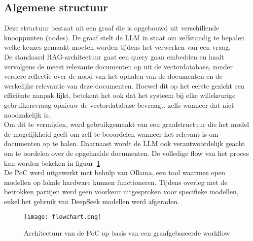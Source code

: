 \subsection{Algemene structuur}

Deze structuur bestaat uit een graaf die is opgebouwd uit verschillende knooppunten (nodes). De graaf stelt de LLM in staat om zelfstandig te bepalen welke keuzes gemaakt moeten worden tijdens het verwerken van een vraag.
\\[1em]
De standaard RAG-architectuur gaat een query gaan embedden en haalt vervolgens de meest relevante documenten op uit de vectordatabase, zonder verdere reflectie over de nood van het ophalen van de documenten en de werkelijke relevantie van deze documenten. Hoewel dit op het eerste gezicht een efficiënte aanpak lijkt, betekent het ook dat het systeem bij elke willekeurige gebruikersvraag opnieuw de vectordatabase bevraagt, zelfs wanneer dat niet noodzakelijk is.
\\[1em]
Om dit te vermijden, werd gebruikgemaakt van een graafstructuur die het model de mogelijkheid geeft om zelf te beoordelen wanneer het relevant is om documenten op te halen. Daarnaast wordt de LLM ook verantwoordelijk geacht om te oordelen over de opgehaalde documenten. De volledige flow van het proces kan worden bekeken in figuur~\ref{fig:Architectuur}
\\[1em]
De PoC werd uitgewerkt met behulp van Ollama, een tool waarmee open modellen op lokale hardware kunnen functioneren. Tijdens overleg met de betrokken partijen werd geen voorkeur uitgesproken voor specifieke modellen, enkel het gebruik van DeepSeek modellen werd afgeraden.

\begin{figure}[H]
    \texttt{[image: flowchart.png]}
    \caption{Architectuur van de PoC op basis van een graafgebaseerde workflow}
    \label{fig:Architectuur}
\end{figure}


